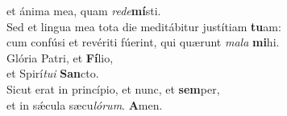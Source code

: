 \evenverse et ánima mea, quam \textit{re}\textit{de}\textbf{mí}sti.\\
\oddverse Sed et lingua mea tota die meditábitur justítiam \textbf{tu}am:~\*\\
\oddverse cum confúsi et revériti fúerint, qui quærunt \textit{ma}\textit{la} \textbf{mi}hi.\\
\evenverse Glória Patri, et \textbf{Fí}lio,~\*\\
\evenverse et Spirí\textit{tu}\textit{i} \textbf{San}cto.\\
\oddverse Sicut erat in princípio, et nunc, et \textbf{sem}per,~\*\\
\oddverse et in sǽcula sæcu\textit{ló}\textit{rum}. \textbf{A}men.\\
